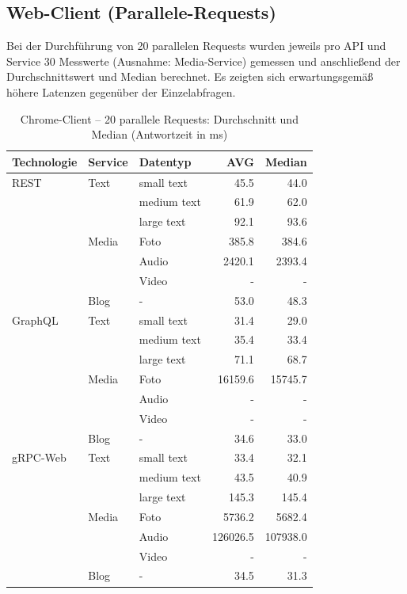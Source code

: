 \subsection{{Web-Client (Parallele-Requests)}}
Bei der Durchführung von 20 parallelen Requests wurden jeweils pro API und Service 30 Messwerte (Ausnahme: Media-Service) gemessen und anschließend der Durchschnittswert und Median berechnet. Es zeigten sich erwartungsgemäß höhere Latenzen gegenüber der Einzelabfragen. 

\begin{table}[h]
	\centering
	\caption{Chrome-Client – 20 parallele Requests: Durchschnitt und Median (Antwortzeit in ms)}
	\label{tab:chrome-20req}
	\renewcommand{\arraystretch}{1.1}
	\begin{tabular}{|l|l|l|r|r|}
		\hline
		\textbf{Technologie} & \textbf{Service} & \textbf{Datentyp} & \textbf{AVG} & \textbf{Median} \\
		\hline
		REST & Text  & small text  & 45.5 & 44.0 \\
		&       & medium text & 61.9 & 62.0 \\
		&       & large text  & 92.1 & 93.6 \\
		& Media & Foto        & 385.8 & 384.6 \\
		&       & Audio       & 2420.1 & 2393.4 \\
		&       & Video       & - & - \\
		& Blog  & -           & 53.0 & 48.3 \\
		\hline
		GraphQL & Text  & small text  & 31.4 & 29.0 \\
		&       & medium text & 35.4 & 33.4 \\
		&       & large text  & 71.1 & 68.7 \\
		& Media & Foto        & 16159.6 & 15745.7 \\
		&       & Audio       & - & - \\
		&       & Video       & - & - \\
		& Blog  & -           & 34.6 & 33.0 \\
		\hline
		gRPC-Web & Text  & small text  & 33.4 & 32.1 \\
		&       & medium text & 43.5 & 40.9 \\
		&       & large text  & 145.3 & 145.4 \\
		& Media & Foto        & 5736.2 & 5682.4 \\
		&       & Audio       & 126026.5 & 107938.0 \\
		&       & Video       & - & - \\
		& Blog  & -           & 34.5 & 31.3 \\
		\hline
	\end{tabular}
\end{table}
\clearpage

